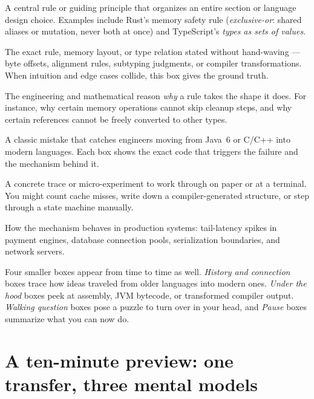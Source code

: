 \begin{focusbox}
A central rule or guiding principle that organizes an entire section or language design choice. Examples include Rust's memory safety rule (\emph{exclusive-or}: shared aliases or mutation, never both at once) and TypeScript's \emph{types as sets of values}.
\end{focusbox}

\begin{formalbox}
The exact rule, memory layout, or type relation stated without hand-waving --- byte offsets, alignment rules, subtyping judgments, or compiler transformations. When intuition and edge cases collide, this box gives the ground truth.
\end{formalbox}

\begin{whybox}
The engineering and mathematical reason \emph{why} a rule takes the shape it does. For instance, why certain memory operations cannot skip cleanup steps, and why certain references cannot be freely converted to other types.
\end{whybox}

\begin{trapbox}
A classic mistake that catches engineers moving from Java~6 or C/C++ into modern languages. Each box shows the exact code that triggers the failure and the mechanism behind it.
\end{trapbox}

\begin{labbox}
A concrete trace or micro-experiment to work through on paper or at a terminal. You might count cache misses, write down a compiler-generated structure, or step through a state machine manually.
\end{labbox}

\begin{applicationbox}
How the mechanism behaves in production systems: tail-latency spikes in payment engines, database connection pools, serialization boundaries, and network servers.
\end{applicationbox}

Four smaller boxes appear from time to time as well. \emph{History and connection} boxes trace how ideas traveled from older languages into modern ones. \emph{Under the hood} boxes peek at assembly, JVM bytecode, or transformed compiler output. \emph{Walking question} boxes pose a puzzle to turn over in your head, and \emph{Pause} boxes summarize what you can now do.

\section*{A ten-minute preview: one transfer, three mental models}


